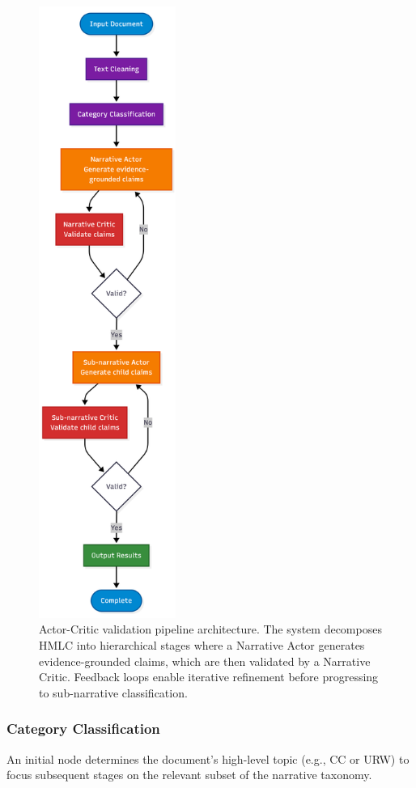 \begin{figure}[!ht]
\centering
\includegraphics[height=20cm]{assets/diagrams/actor-critique.png}
\caption{Actor-Critic validation pipeline architecture. The system decomposes HMLC into hierarchical stages where a Narrative Actor generates evidence-grounded claims, which are then validated by a Narrative Critic. Feedback loops enable iterative refinement before progressing to sub-narrative classification.}
\label{fig:actor_critic_pipeline}
\end{figure}

\subsubsection{Category Classification}

An initial node determines the document's high-level topic (e.g., CC or URW) to focus subsequent stages on the relevant subset of the narrative taxonomy.

